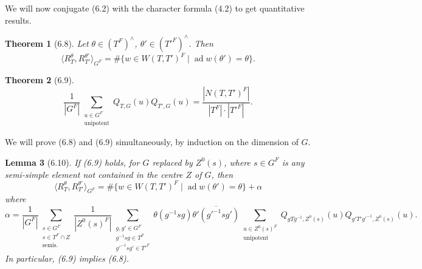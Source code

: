 \documentclass[11pt]{amsart}
\theoremstyle{plain}
\newtheorem{theorem}{Theorem}[section]
\newtheorem{lemma}[theorem]{Lemma}
\theoremstyle{remark}
\DeclareMathOperator{\ad}{ad}
\begin{document}
We will now conjugate (6.2) with the character formula (4.2) to get quantitative results.

\begin{theorem}[6.8]
Let $\theta \in (T^F)^\wedge$, $\theta' \in (T'^F)^\wedge$. Then
\[
\langle R_T^\theta, R_{T'}^{\theta'} \rangle_{G^F} = \#\{w \in W(T, T')^F \mid \ad w(\theta') = \theta\}.
\]
\end{theorem}

\begin{theorem}[6.9]
\begin{equation}\label{eq:6.9.1}
\frac{1}{|G^F|} \sum_{\substack{u \in G^F \\ \text{unipotent}}} Q_{T,G}(u) Q_{T',G}(u) = \frac{|N(T, T')^F|}{|T^F| \cdot |T'^F|}.
\end{equation}
\end{theorem}

We will prove (6.8) and (6.9) simultaneously, by induction on the dimension of $G$.

\begin{lemma}[6.10]
If (6.9) holds, for $G$ replaced by $Z^0(s)$, where $s \in G^F$ is any semi-simple element not contained in the centre $Z$ of $G$, then
\begin{equation}\label{eq:6.10.1}
\langle R_T^\theta, R_{T'}^{\theta'} \rangle_{G^F} = \#\{w \in W(T, T')^F \mid \ad w(\theta') = \theta\} + \alpha
\end{equation}
where
\[
\alpha = \frac{1}{|G^F|} \sum_{\substack{s \in G^F \\ s \in T^F \cap Z \\ \text{semis.}}} \frac{1}{|Z^0(s)^F|} \sum_{\substack{g, g' \in G^F \\ g^{-1}sg \in T^F \\ g'^{-1}sg' \in T'^F}} \theta(g^{-1}sg)\overline{\theta'(g'^{-1}sg')} \sum_{\substack{u \in Z^0(s)^F \\ \text{unipotent}}} Q_{gTg^{-1}, Z^0(s)}(u) Q_{g'T'g'^{-1}, Z^0(s)}(u).
\]
In particular, (6.9) implies (6.8).
\end{lemma}
\end{document}

